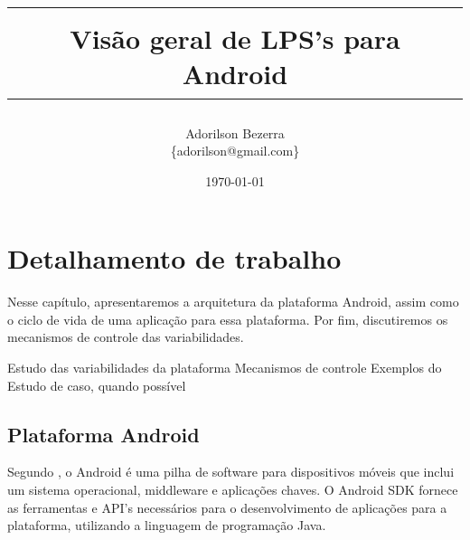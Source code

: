 \documentclass[a4paper,12pt]{report}
\title
{
    \vspace{1.5cm}
    \begin{table}[h]
    \centering
    \setlength{\arrayrulewidth}{3.5\arrayrulewidth}
        \begin{tabular}{c}
        \hline\\
        \vspace{0.3cm}\Huge Visão geral de LPS's para Android\\
        \hline
        \end{tabular}
    \end{table}
}
\author
{
    Adorilson Bezerra\\
    \{adorilson@gmail.com\}
}
\date{\vspace{1.5cm}\today}
\begin{document}
\maketitle

\tableofcontents
\listoffigures
\listoftables

\pagebreak
{}

\pagestyle{headings}



\chapter{Detalhamento de trabalho}

Nesse capítulo, apresentaremos a arquitetura da plataforma Android, assim como o
ciclo de vida de uma aplicação para essa plataforma. Por fim, discutiremos os 
mecanismos de controle das variabilidades.

 Estudo das variabilidades da plataforma
 Mecanismos de controle
 Exemplos do Estudo de caso, quando possível

\section{Plataforma Android}
Segundo \cite{whatisandroid}, o Android é uma pilha de software para dispositivos
móveis que inclui um sistema operacional, middleware e aplicações chaves. O Android
SDK fornece as ferramentas e API's necessários para o desenvolvimento de aplicações
para a plataforma, utilizando a linguagem de programação Java.
\end{document}
